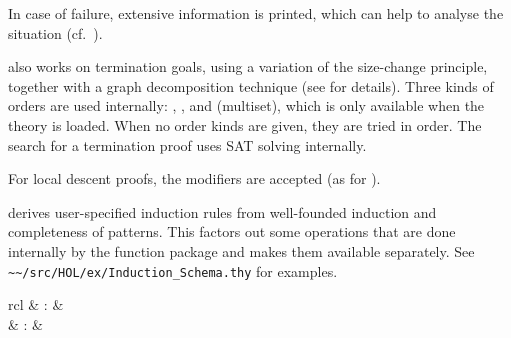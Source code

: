 \begin{isabellebody}
\begin{isamarkuptext}
\begin{description}
  In case of failure, extensive information is printed, which can help
  to analyse the situation (cf.\ \cite{isabelle-function}).

  \item \hyperlink{method.HOL.size-change}{\mbox{}} also works on termination goals,
  using a variation of the size-change principle, together with a
  graph decomposition technique (see \cite{krauss_phd} for details).
  Three kinds of orders are used internally: , ,
  and  (multiset), which is only available when the theory
   is loaded. When no order kinds are given, they are
  tried in order. The search for a termination proof uses SAT solving
  internally.

  For local descent proofs, the \hyperlink{syntax.clasimpmod}{\mbox{}} modifiers are
  accepted (as for \hyperlink{method.auto}{\mbox{}}).

  \item \hyperlink{method.HOL.induction-schema}{\mbox{}} derives user-specified
  induction rules from well-founded induction and completeness of
  patterns. This factors out some operations that are done internally
  by the function package and makes them available separately. See
  \verb|~~/src/HOL/ex/Induction_Schema.thy| for examples.

  \end{description}%
\end{isamarkuptext}%
\isamarkuptrue%
%
\isamarkuptrue%
%
\begin{isamarkuptext}%
\begin{matharray}{rcl}
    \hypertarget{command.HOL.partial-function}{\hyperlink{command.HOL.partial-function}{\mbox{}}} & : &  \\
    \hypertarget{attribute.HOL.partial-function-mono}{\hyperlink{attribute.HOL.partial-function-mono}{\mbox{}}} & : &  \\
  \end{matharray}


\end{isamarkuptext}
\end{isabellebody}
